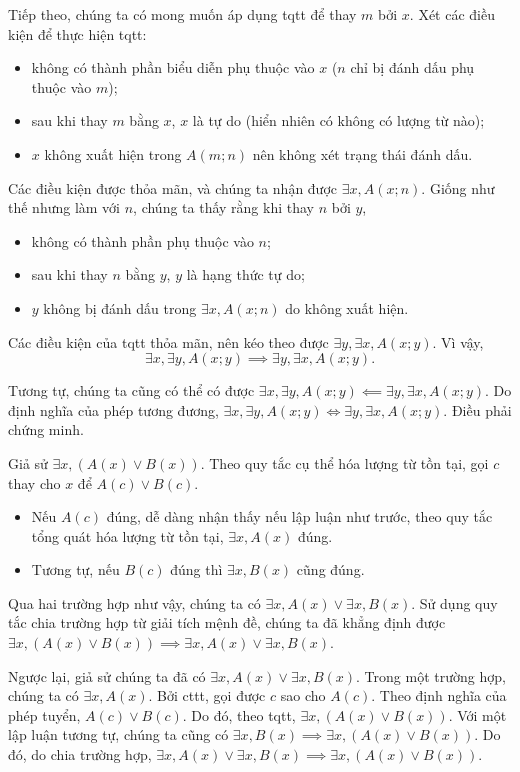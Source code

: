 Tiếp theo, chúng ta có mong muốn áp dụng tqtt để thay $m$ bởi $x$. Xét các điều kiện để thực hiện tqtt:
\begin{itemize}
   \item không có thành phần biểu diễn phụ thuộc vào $x$ ($n$ chỉ bị đánh dấu phụ thuộc vào $m$);
   \item sau khi thay $m$ bằng $x$, $x$ là tự do (hiển nhiên có không có lượng từ nào);
   \item $x$ không xuất hiện trong $A(m; n)$ nên không xét trạng thái đánh dấu.
\end{itemize}
Các điều kiện được thỏa mãn, và chúng ta nhận được $\exists x, A(x; n)$. Giống như thế nhưng làm với $n$, chúng ta thấy rằng khi thay $n$ bởi $y$,
\begin{itemize}
   \item không có thành phần phụ thuộc vào $n$;
   \item sau khi thay $n$ bằng $y$, $y$ là hạng thức tự do;
   \item $y$ không bị đánh dấu trong $\exists x, A(x; n)$ do không xuất hiện.
\end{itemize} 
Các điều kiện của tqtt thỏa mãn, nên kéo theo được $\exists y, \exists x, A(x; y)$. Vì vậy, 
$$
\exists x, \exists y, A(x; y) \implies \exists y, \exists x, A(x; y).
$$

Tương tự, chúng ta cũng có thể có được $\exists x, \exists y, A(x; y) \impliedby \exists y, \exists x, A(x; y)$. Do định nghĩa của phép tương đương, $\exists x, \exists y, A(x; y) \iff \exists y, \exists x, A(x; y)$. Điều phải chứng minh.

\stepSubexercise Giả sử $\exists x, (A(x) \lor B(x))$. Theo quy tắc cụ thể hóa lượng từ tồn tại, gọi $c$ thay cho $x$ để $A(c) \lor B(c)$.
\begin{itemize}
   \item Nếu $A(c)$ đúng, dễ dàng nhận thấy nếu lập luận như trước, theo quy tắc tổng quát hóa lượng từ tồn tại, $\exists x, A(x)$ đúng.
   \item Tương tự, nếu $B(c)$ đúng thì $\exists x, B(x)$ cũng đúng.
\end{itemize}
Qua hai trường hợp như vậy, chúng ta có $\exists x, A(x) \lor \exists x, B(x)$.  Sử dụng quy tắc chia trường hợp từ giải tích mệnh đề, chúng ta đã khẳng định được $\exists x, (A(x) \lor B(x)) \implies \exists x, A(x) \lor \exists x, B(x)$.

Ngược lại, giả sử chúng ta đã có $\exists x, A(x) \lor \exists x, B(x)$. Trong một trường hợp, chúng ta có $\exists x, A(x)$. Bởi cttt, gọi được $c$ sao cho $A(c)$. Theo định nghĩa của phép tuyển, $A(c) \lor B(c)$. Do đó, theo tqtt, $\exists x, (A(x) \lor B(x))$. Với một lập luận tương tự, chúng ta cũng có $\exists x, B(x) \implies \exists x, (A(x) \lor B(x))$. Do đó, do chia trường hợp, $\exists x, A(x) \lor \exists x, B(x) \implies \exists x, (A(x) \lor B(x))$.

